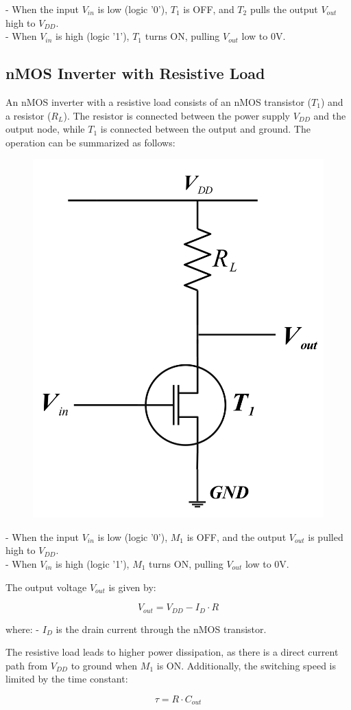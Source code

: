 \documentclass[a4paper,12pt]{article}
\begin{document}
- When the input \(V_{in}\) is low (logic '0'), \(T_1\) is OFF, and \(T_2\) pulls the output \(V_{out}\) high to \(V_{DD}\).\\
- When \(V_{in}\) is high (logic '1'), \(T_1\) turns ON, pulling \(V_{out}\) low to 0V.


\subsection{nMOS Inverter with Resistive Load}

An nMOS inverter with a resistive load consists of an nMOS transistor (\(T_1\)) and a resistor (\(R_L\)). The resistor is connected between the power supply \(V_{DD}\) and the output node, while \(T_1\) is connected between the output and ground. The operation can be summarized as follows:
\begin{figure}[H]
	\centering
	\includegraphics[width=0.45\linewidth]{../EXP04_EEE2214/Images/mos/2}
	\caption{}
	\label{fig:1}
\end{figure}
- When the input \(V_{in}\) is low (logic '0'), \(M_1\) is OFF, and the output \(V_{out}\) is pulled high to \(V_{DD}\).\\
- When \(V_{in}\) is high (logic '1'), \(M_1\) turns ON, pulling \(V_{out}\) low to 0V.

The output voltage \( V_{out} \) is given by:

\[
V_{out} = V_{DD} - I_{D} \cdot R
\]

where:
- \( I_{D} \) is the drain current through the nMOS transistor.

The resistive load leads to higher power dissipation, as there is a direct current path from \( V_{DD} \) to ground when \( M_1 \) is ON. Additionally, the switching speed is limited by the time constant:

\[
\tau = R \cdot C_{out}
\]
\end{document}
